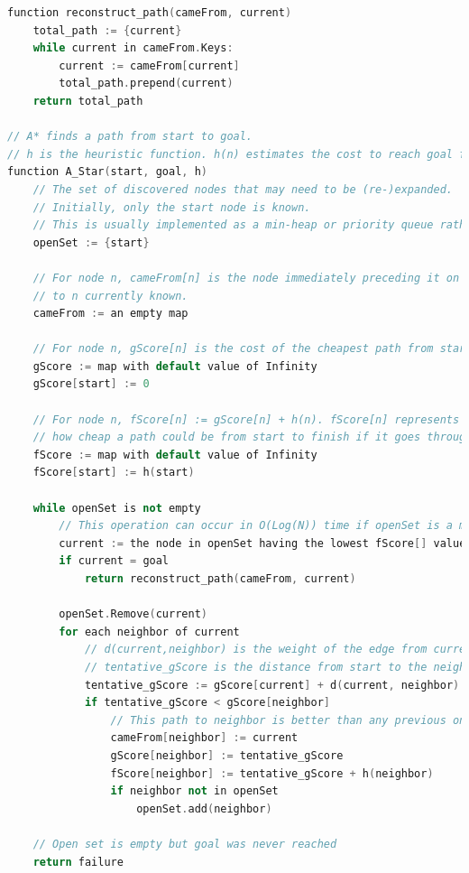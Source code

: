 \documentclass[twocolumn]{article}
\begin{document}
\begin{lstlisting}[language=C++, caption=A* Pseudo Code, style={researchpaper}, label={lst:A}]
function reconstruct_path(cameFrom, current)
    total_path := {current}
    while current in cameFrom.Keys:
        current := cameFrom[current]
        total_path.prepend(current)
    return total_path

// A* finds a path from start to goal.
// h is the heuristic function. h(n) estimates the cost to reach goal from node n.
function A_Star(start, goal, h)
    // The set of discovered nodes that may need to be (re-)expanded.
    // Initially, only the start node is known.
    // This is usually implemented as a min-heap or priority queue rather than a hash-set.
    openSet := {start}

    // For node n, cameFrom[n] is the node immediately preceding it on the cheapest path from the start
    // to n currently known.
    cameFrom := an empty map

    // For node n, gScore[n] is the cost of the cheapest path from start to n currently known.
    gScore := map with default value of Infinity
    gScore[start] := 0

    // For node n, fScore[n] := gScore[n] + h(n). fScore[n] represents our current best guess as to
    // how cheap a path could be from start to finish if it goes through n.
    fScore := map with default value of Infinity
    fScore[start] := h(start)

    while openSet is not empty
        // This operation can occur in O(Log(N)) time if openSet is a min-heap or a priority queue
        current := the node in openSet having the lowest fScore[] value
        if current = goal
            return reconstruct_path(cameFrom, current)

        openSet.Remove(current)
        for each neighbor of current
            // d(current,neighbor) is the weight of the edge from current to neighbor
            // tentative_gScore is the distance from start to the neighbor through current
            tentative_gScore := gScore[current] + d(current, neighbor)
            if tentative_gScore < gScore[neighbor]
                // This path to neighbor is better than any previous one. Record it!
                cameFrom[neighbor] := current
                gScore[neighbor] := tentative_gScore
                fScore[neighbor] := tentative_gScore + h(neighbor)
                if neighbor not in openSet
                    openSet.add(neighbor)

    // Open set is empty but goal was never reached
    return failure
\end{lstlisting}
\nocite{*}


\end{document}
